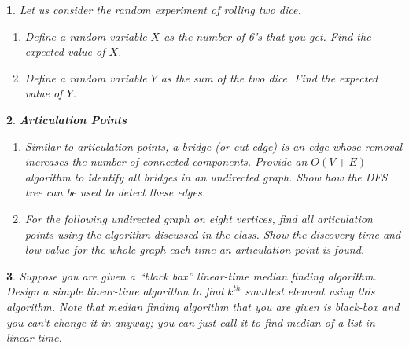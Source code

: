 \documentclass[%
addpoints]{exam}
\theoremstyle{problem}
\newtheorem{p}{}
\begin{document}
\begin{p}
    Let us consider the random experiment of rolling two dice.

    \begin{enumerate}
        \item Define a random variable \(X\) as the number of 6's that you get. Find the expected value of \(X\).
        \item Define a random variable \(Y\) as the sum of the two dice. Find the expected value of \(Y\).
\end{enumerate}
\hfill 
\end{p}


\begin{p}
    {\bf Articulation Points}
\begin{enumerate}
    \item Similar to articulation points, a \emph{bridge} (or cut edge) is an edge whose removal increases the number of connected components. 
    Provide an \(O(V + E)\) algorithm to identify all bridges in an undirected graph. Show how the DFS tree can be used to detect these edges.
    \item For the following undirected graph on eight vertices, find all articulation points using the algorithm discussed in the class. Show the
    discovery time and low value for the whole graph each time an articulation point is found.
    \begin{figure}[!ht]
        \centering
    \end{figure}
\end{enumerate}
       
\hfill  
\end{p}


\begin{p}
    Suppose you are given a ``black box'' linear-time median finding algorithm. Design a simple linear-time algorithm to find $k^{th}$ smallest element using this algorithm. Note that median finding algorithm that you are given is black-box and you can't change it in anyway; you can just call it to find median of a list in linear-time.
\hfill 
\end{p}
\end{document}
